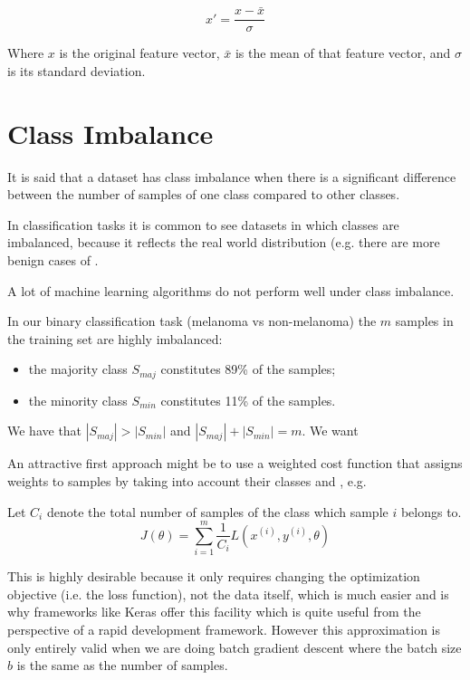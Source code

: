 $$
x' = \frac{x - \bar{x}}{\sigma}
$$

Where $x$ is the original feature vector, $\bar{x}$ is the mean of that feature vector, and $\sigma$ is its standard deviation.

\section{Class Imbalance}
\label{subsection:classimbalance}

It is said that a dataset has class imbalance when there is a significant difference between the number of samples of one class compared to other classes.

In classification tasks it is common to see datasets in which classes are imbalanced, because it reflects the real world distribution (e.g. there are more benign cases of .

A lot of machine learning algorithms do not perform well under class imbalance. 

In our binary classification task (melanoma vs non-melanoma) the $m$ samples in the training set are highly imbalanced:

\begin{itemize}
    \item the majority class $S_{maj}$ constitutes 89\% of the samples;
    \item the minority class $S_{min}$ constitutes 11\% of the samples.
\end{itemize}

We have that $|S_{maj}| > |S_{min}|$ and $|S_{maj}| + |S_{min}| = m$. We want

An attractive first approach might be to use a weighted cost function that assigns weights to samples by taking into account their classes and , e.g.

Let $C_i$ denote the total number of samples of the class which sample $i$ belongs to.
$$
J(\theta) = \sum_{i=1}^{m} \frac{1}{C_i} L(x^{(i)}, y^{(i)}, \theta)
$$

This is highly desirable because it only requires changing the optimization objective (i.e. the loss function), not the data itself, which is much easier and is why frameworks like Keras offer this facility which is quite useful from the perspective of a rapid development framework. However this approximation is only entirely valid when we are doing batch gradient descent where the batch size $b$ is the same as the number of samples.



